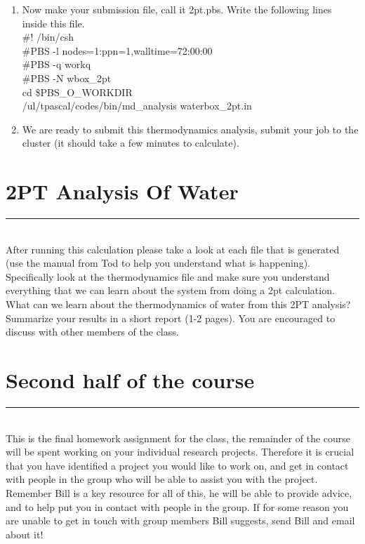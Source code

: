 \documentclass{article}
\begin{document}
\begin{enumerate}
\item Now make your submission file, call it 2pt.pbs.
Write the following lines inside this file.\\
\#! /bin/csh\\
\#PBS -l nodes=1:ppn=1,walltime=72:00:00\\
\#PBS -q workq\\
\#PBS -N wbox\_2pt\\
cd \$PBS\_O\_WORKDIR\\
/ul/tpascal/codes/bin/md\_analysis waterbox\_2pt.in\\

\item We are ready to submit this thermodynamics analysis, submit your job to the cluster (it should take a few minutes to calculate).
\end{enumerate}

\section{2PT Analysis Of Water}
\noindent\rule[0.5ex]{\linewidth}{1pt}\\

After running this calculation please take a look at each file that is generated (use the manual from Tod to help you understand what is happening). 
Specifically look at the thermodynamics file and make sure you understand everything that we can learn about the system from doing a 2pt calculation.\\

What can we learn about the thermodynamics of water from this 2PT analysis? Summarize your results in a short report (1-2 pages). You are encouraged to discuss with other members of the class.\\

\section{Second half of the course}
\noindent\rule[0.5ex]{\linewidth}{1pt}\\

This is the final homework assignment for the class, the remainder of the course will be spent working on your individual research projects.
Therefore it is crucial that you have identified a project you would like to work on, and get in contact with people in the group who will be able to assist you with the project. 
Remember Bill is a key resource for all of this, he will be able to provide advice, and to help put you in contact with people in the group.
If for some reason you are unable to get in touch with group members Bill suggests, send Bill and email about it!\\
\end{document}
